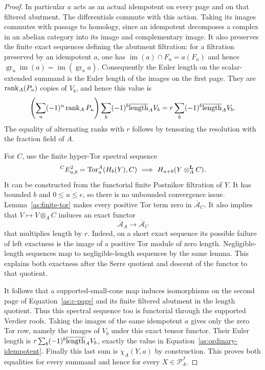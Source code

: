 \begin{proof}
In particular $a$ acts as an actual
idempotent on every page and on that filtered abutment. The
differentials commute with this action. Taking its images commutes
with passage to homology, since an idempotent decomposes a complex
in an abelian category into its image and complementary image.
It also preserves the finite exact sequences defining the
abutment filtration: for a filtration preserved by an idempotent
$a$, one has $\operatorname{im}(a)\cap F_u=a(F_u)$ and hence
$\operatorname{gr}_u\operatorname{im}(a)
=\operatorname{im}(\operatorname{gr}_u a)$.
Consequently the Euler length on the
scalar-extended summand is the Euler length of the images on
the first page. They are $\operatorname{rank}_A(P_u)$ copies of $V_b$, and hence
this value is
\begin{equation}
 \left(\sum_u(-1)^u\operatorname{rank}_A P_u\right)
 \sum_b(-1)^b\overline{\operatorname{length}}_A V_b
 =r\sum_b(-1)^b\overline{\operatorname{length}}_A V_b.
 \label{as:ordinary-idempotent}
\end{equation}
The equality of alternating ranks with $r$ follows by tensoring
the resolution with the fraction field of $A$.

For $C$, use the finite hyper-Tor spectral sequence
\begin{equation}
 {}^CE^2_{u,b}=\operatorname{Tor}_u^A(H_b(Y),C)
 \ \Longrightarrow\ H_{u+b}(Y\otimes_A^{\mathbf L}C).
 \label{as:c-page}
\end{equation}
It can be constructed from the functorial finite Postnikov
filtration of $Y$. It has bounded $b$ and $0\leq u\leq e$, so
there is no unbounded convergence issue. Lemma~\ref{as:finite-tor}
makes every positive Tor term zero in
$\overline{\mathcal A}_C$. It also implies that
$V\mapsto V\otimes_A C$ induces an exact functor
\[
 \overline{\mathcal A}_A\longrightarrow
 \overline{\mathcal A}_C
\]
that multiplies length by $r$. Indeed, on a short exact sequence
its possible failure of left exactness is the image of a
positive Tor module of zero length. Negligible-length sequences
map to negligible-length sequences by the same lemma. This
explains both exactness after the Serre quotient and descent of
the functor to that quotient.

It follows that a supported-small-cone map induces isomorphisms
on the second page of Equation~\eqref{as:c-page} and its finite
filtered abutment in the length quotient. Thus this spectral
sequence too is functorial through the supported Verdier roofs.
Taking the images of the same idempotent $a$ gives only the zero
Tor row, namely the images of $V_b$ under this exact tensor
functor. Their Euler length is
$r\sum_b(-1)^b\overline{\operatorname{length}}_A V_b$, exactly the value in
Equation~\eqref{as:ordinary-idempotent}. Finally this last sum
is $\chi_A(Y,a)$ by construction. This proves both equalities
for every summand and hence for every $X\in\mathcal P_A^J$.
\end{proof}

